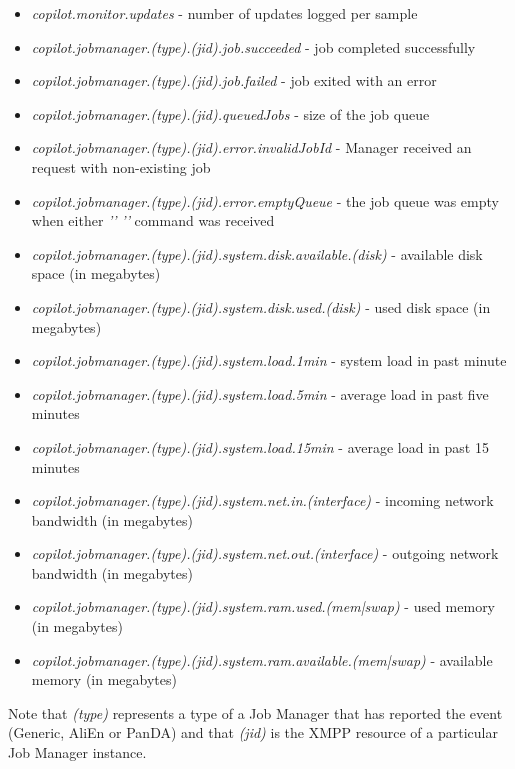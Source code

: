 \begin{itemize}
  \item \emph{copilot.monitor.updates} - number of updates logged per sample
  \item \emph{copilot.jobmanager.(type).(jid).job.succeeded} - job completed successfully
  \item \emph{copilot.jobmanager.(type).(jid).job.failed} - job exited with an error
  \item \emph{copilot.jobmanager.(type).(jid).queuedJobs} - size of the job queue
  \item \emph{copilot.jobmanager.(type).(jid).error.invalidJobId} - Manager received an request with non-existing job
  \item \emph{copilot.jobmanager.(type).(jid).error.emptyQueue} - the job queue was empty when either \emph{''} \emph{''} command was received
  \item \emph{copilot.jobmanager.(type).(jid).system.disk.available.(disk)} - available disk space (in megabytes)
  \item \emph{copilot.jobmanager.(type).(jid).system.disk.used.(disk)} - used disk space (in megabytes)
  \item \emph{copilot.jobmanager.(type).(jid).system.load.1min} - system load in past minute
  \item \emph{copilot.jobmanager.(type).(jid).system.load.5min} - average load in past five minutes
  \item \emph{copilot.jobmanager.(type).(jid).system.load.15min} - average load in past 15 minutes
  \item \emph{copilot.jobmanager.(type).(jid).system.net.in.(interface)} - incoming network bandwidth (in megabytes)
  \item \emph{copilot.jobmanager.(type).(jid).system.net.out.(interface)} - outgoing network bandwidth (in megabytes)
  \item \emph{copilot.jobmanager.(type).(jid).system.ram.used.(mem|swap)} - used memory (in megabytes)
  \item \emph{copilot.jobmanager.(type).(jid).system.ram.available.(mem|swap)} - available memory (in megabytes)
\end{itemize}

Note that \emph{(type)} represents a type of a Job Manager that has reported the event (Generic, AliEn or PanDA) and that \emph{(jid)} is the XMPP resource of a particular Job Manager instance.
